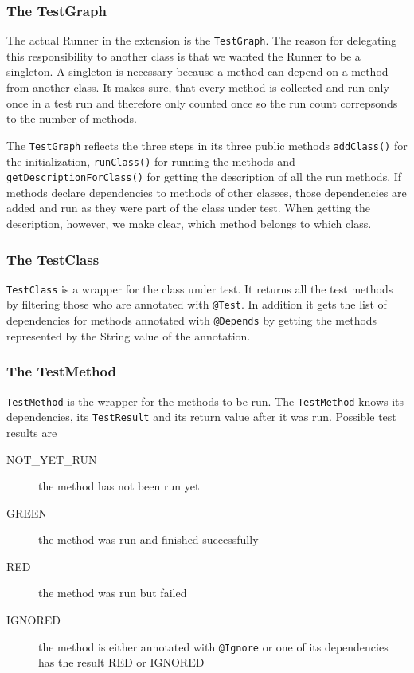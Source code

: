 \documentclass[11pt]{article}
\begin{document}
\subsubsection{The TestGraph}

The actual Runner in the extension is the \verb|TestGraph|. The reason for delegating this responsibility to another class is that we wanted the Runner to be a singleton. A singleton is necessary because a method can depend on a method from another class. It makes sure, that every method is collected and run only once in a test run and therefore only counted once so the run count correpsonds to the number of methods.

The \verb|TestGraph| reflects the three steps in its three public methods \verb|addClass()| for the initialization, \verb|runClass()| for running the methods and \verb|getDescriptionForClass()| for getting the description of all the run methods. If methods declare dependencies to methods of other classes, those dependencies are added and run as they were part of the class under test. When getting the description, however, we make clear, which method belongs to which class.

\subsubsection{The TestClass}

\verb|TestClass| is a wrapper for the class under test. It returns all the test methods by filtering those who are annotated with \verb|@Test|. In addition it gets the list of dependencies for methods annotated with \verb|@Depends| by getting the methods represented by the String value of the annotation.

\subsubsection{The TestMethod}

\verb|TestMethod| is the wrapper for the methods to be run. The \verb|TestMethod| knows its dependencies, its \verb|TestResult| and its return value after it was run. Possible test results are

\begin{description}
 \item[NOT\_YET\_RUN] the method has not been run yet
 \item[GREEN] the method was run and finished successfully
 \item[RED] the method was run but failed
 \item[IGNORED] the method is either annotated with \verb|@Ignore| or one of its dependencies has the result RED or IGNORED
 \end{description}
\end{document}
